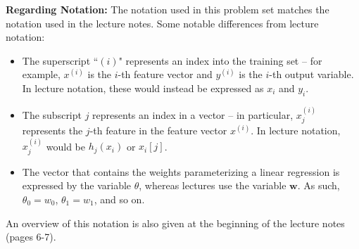 \textbf{Regarding Notation:} The notation used in this problem set matches the notation used in the lecture notes. Some notable differences from lecture notation:
\begin{itemize}
    \item The superscript ``$(i)$" represents an index into the training set -- for example, $x^{(i)}$ is the $i$-th feature vector and $y^{(i)}$ is the $i$-th output variable. In lecture notation, these would instead be expressed as $x_i$ and $y_i$.

    \item The subscript $j$ represents an index in a vector -- in particular, $x^{(i)}_j$ represents the $j$-th feature in the feature vector $x^{(i)}$. In lecture notation, $x^{(i)}_j$ would be $h_j(x_i)$ or $x_i[j]$.

    \item The vector that contains the weights parameterizing a linear regression is expressed by the variable $\theta$, whereas lectures use the variable $\textbf{w}$. As such, $\theta_0 = w_0$, $\theta_1 = w_1$, and so on.



\end{itemize}

An overview of this notation is also given at the beginning of the lecture notes (pages 6-7).